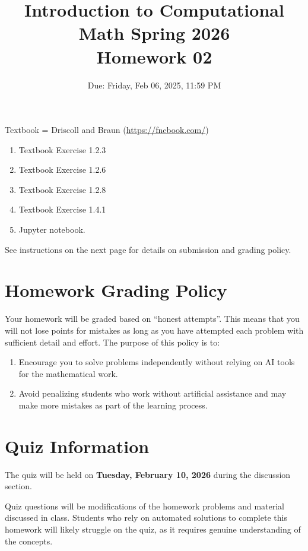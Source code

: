\documentclass[reqno]{exam}
\title{Introduction to Computational Math Spring 2026 \\ Homework 02}
\date{Due: Friday, Feb 06, 2025, 11:59 PM}
\author{}
\begin{document}
\maketitle
\thispagestyle{empty}

Textbook = Driscoll and Braun (\url{https://fncbook.com/})

\begin{enumerate}

\item Textbook Exercise 1.2.3

\item Textbook Exercise 1.2.6

\item Textbook Exercise 1.2.8

\item Textbook Exercise 1.4.1

\item

Jupyter notebook.

\end{enumerate}

See instructions on the next page for details on submission and grading policy.

\newpage
\section*{Homework Grading Policy}

Your homework will be graded based on ``honest attempts''.
This means that you will not lose points for mistakes as long as you have attempted each problem with sufficient detail and effort.
The purpose of this policy is to:
\begin{enumerate}
  \item Encourage you to solve problems independently without relying on AI tools for the mathematical work.
  \item Avoid penalizing students who work without artificial assistance and may make more mistakes as part of the learning process.
\end{enumerate}

\section*{Quiz Information}

The quiz will be held on {\bf Tuesday, February 10, 2026} during the discussion section.

Quiz questions will be modifications of the homework problems and material discussed in class. Students who rely on automated solutions to complete this homework will likely struggle on the quiz, as it requires genuine understanding of the concepts.
\end{document}
